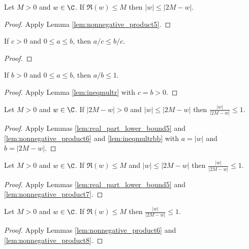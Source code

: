 \begin{lemma}\label{lem:nonnegative_product6}  \leanok
Let $M>0$ and $w \in \C$. If $\Re(w) \le M$ then $|w|\le |2M-w|$.
\end{lemma}
\begin{proof} \leanok {}
Apply Lemma \ref{lem:nonnegative_product5}.
\end{proof}

\begin{lemma}\label{lem:ineqmultr}  \leanok
If $c>0$ and $0\le a\le b$, then $a/c\le b/c$.
\end{lemma}
\begin{proof} \leanok
\end{proof}


\begin{lemma}\label{lem:ineqmultrbb}  \leanok
If $b>0$ and $0\le a\le b$, then $a/b\le 1$.
\end{lemma}
\begin{proof} \leanok {}
Apply Lemma \ref{lem:ineqmultr} with $c=b>0$.
\end{proof}

\begin{lemma}\label{lem:nonnegative_product7}  \leanok
Let $M>0$ and $w \in \C$. If $|2M-w|>0$ and $|w|\le |2M-w|$ then $\frac{|w|}{|2M-w|} \le 1$.
\end{lemma}
\begin{proof} \leanok {}
Apply Lemmas \ref{lem:real_part_lower_bound5} and \ref{lem:nonnegative_product6} and \ref{lem:ineqmultrbb} with $a=|w|$ and $b=|2M-w|$.
\end{proof}

\begin{lemma}\label{lem:nonnegative_product8}  \leanok
Let $M>0$ and $w \in \C$. If $\Re(w) \le M$ and $|w|\le |2M-w|$ then $\frac{|w|}{|2M-w|} \le 1$.
\end{lemma}
\begin{proof} \leanok {}
Apply Lemmas \ref{lem:real_part_lower_bound5} and \ref{lem:nonnegative_product7}.
\end{proof}

\begin{lemma}\label{lem:nonnegative_product9}  \leanok
Let $M>0$ and $w \in \C$. If $\Re(w) \le M$ then $\frac{|w|}{|2M-w|} \le 1$.
\end{lemma}
\begin{proof} \leanok {}
Apply Lemmas \ref{lem:nonnegative_product6} and \ref{lem:nonnegative_product8}.
\end{proof}


